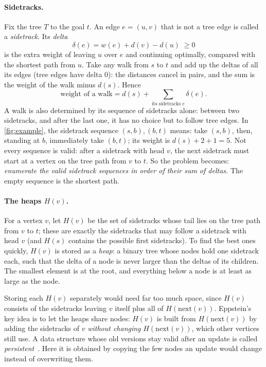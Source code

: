 \documentclass[11pt,a4paper]{article}
\begin{document}
\paragraph{Sidetracks.} Fix the tree $T$ to the goal $t$. An edge $e=(u,v)$ that is not a tree edge is called a
\emph{sidetrack}. Its \emph{delta}
\[\delta(e)=w(e)+d(v)-d(u)\;\ge 0\]
is the extra weight of leaving $u$ over $e$ and continuing optimally, compared with the shortest path from $u$. Take
any walk from $s$ to $t$ and add up the deltas of all its edges (tree edges have delta $0$): the distances cancel
in pairs, and the sum is the weight of the walk minus $d(s)$. Hence
\[\text{weight of a walk}=d(s)+\sum_{\text{its sidetracks }e}\delta(e).\]
A walk is also determined by its sequence of sidetracks alone: between two sidetracks, and after the last one, it
has no choice but to follow tree edges. In \cref{fig:example}, the sidetrack sequence $(s,b),(b,t)$ means: take
$(s,b)$, then, standing at $b$, immediately take $(b,t)$; its weight is $d(s)+2+1=5$. Not every sequence is valid:
after a sidetrack with head $v$, the next sidetrack must start at a vertex on the tree path from $v$ to $t$. So
the problem becomes: \emph{enumerate the valid sidetrack sequences in order of their sum of deltas.} The empty
sequence is the shortest path.

\paragraph{The heaps $H(v)$.} For a vertex $v$, let $H(v)$ be the set of sidetracks whose tail lies on the tree path
from $v$ to $t$; these are exactly the sidetracks that may follow a sidetrack with head $v$ (and $H(s)$ contains
the possible first sidetracks). To find the best ones quickly, $H(v)$ is stored as a \emph{heap}: a binary tree
whose nodes hold one sidetrack each, such that the delta of a node is never larger than the deltas of its children.
The smallest element is at the root, and everything below a node is at least as large as the node.

Storing each $H(v)$ separately would need far too much space, since $H(v)$ consists of the sidetracks leaving $v$
itself plus all of $H(\mathrm{next}(v))$. Eppstein's key idea is to let the heaps share nodes: $H(v)$ is built from
$H(\mathrm{next}(v))$ by adding the sidetracks of $v$ \emph{without changing} $H(\mathrm{next}(v))$, which other
vertices still use. A data structure whose old versions stay valid after an update is called
\emph{persistent}~\cite{driscoll1989}. Here it is obtained by copying the few nodes an update would change instead
of overwriting them.
\end{document}
